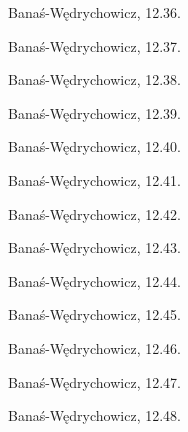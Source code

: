 \begin{problem}
    Banaś-Wędrychowicz, 12.36.
\end{problem}

\begin{problem}
    Banaś-Wędrychowicz, 12.37.
\end{problem}

\begin{problem}
    Banaś-Wędrychowicz, 12.38.
\end{problem}

\begin{problem}
    Banaś-Wędrychowicz, 12.39.
\end{problem}

\begin{problem}
    Banaś-Wędrychowicz, 12.40.
\end{problem}

\begin{problem}
    Banaś-Wędrychowicz, 12.41.
\end{problem}

\begin{problem}
    Banaś-Wędrychowicz, 12.42.
\end{problem}

\begin{problem}
    Banaś-Wędrychowicz, 12.43.
\end{problem}

\begin{problem}
    Banaś-Wędrychowicz, 12.44.
\end{problem}

\begin{problem}
    Banaś-Wędrychowicz, 12.45.
\end{problem}

\begin{problem}
    Banaś-Wędrychowicz, 12.46.
\end{problem}

\begin{problem}
    Banaś-Wędrychowicz, 12.47.
\end{problem}

\begin{problem}
    Banaś-Wędrychowicz, 12.48.
\end{problem}

